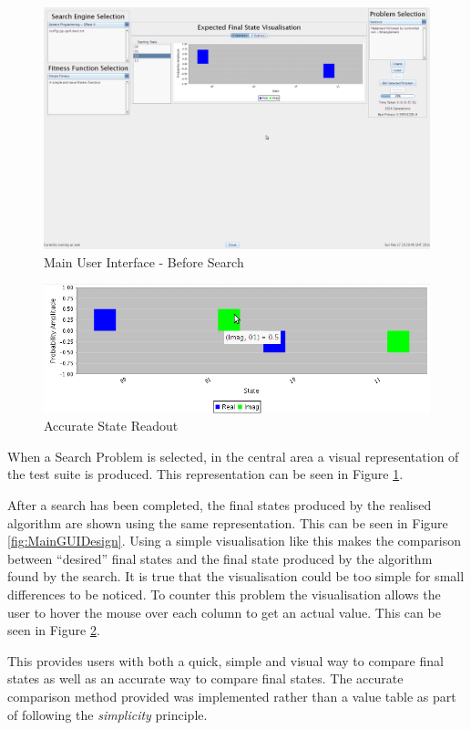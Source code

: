 \begin{figure}
 \includegraphics[width=\textwidth]{GUIDesignProgress.png}
\caption{Main User Interface - Before Search}
\label{fig:MainGUIDesignProg}
\end{figure}
\begin{figure}
 \includegraphics[width=\textwidth]{AccurateReadOutMouseOver.png}
\caption{Accurate State Readout}
\label{fig:AccStateReadOut}
\end{figure}
When a Search Problem is selected, in the central area a visual representation of the test suite is produced.
This representation can be seen in Figure \ref{fig:MainGUIDesignProg}.

After a search has been completed, the final states produced by the realised algorithm are shown using the same representation.
This can be seen in Figure \ref{fig:MainGUIDesign}.
Using a simple visualisation like this makes the comparison between ``desired'' final states and the final state produced by the algorithm found by the search.
It is true that the visualisation could be too simple for small differences to be noticed.
To counter this problem the visualisation allows the user to hover the mouse over each column to get an actual value.
This can be seen in Figure \ref{fig:AccStateReadOut}.

This provides users with both a quick, simple and visual way to compare final states as well as an accurate way to compare final states.
The accurate comparison method provided was implemented rather than a value table as part of following the \emph{simplicity} principle.

